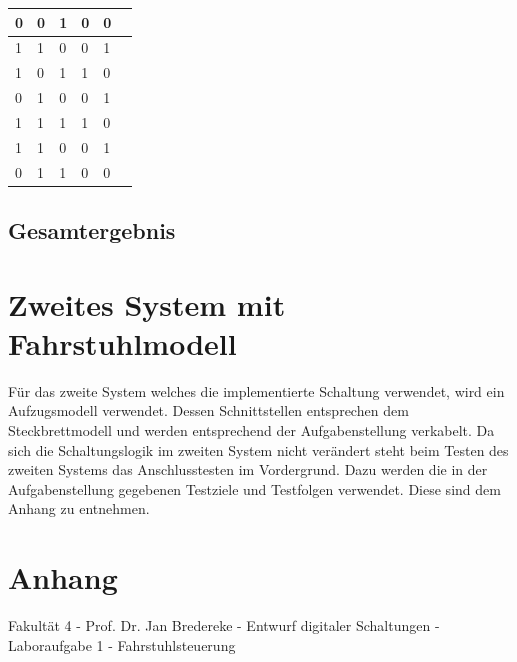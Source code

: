 \documentclass[a4paper,12pt,bibtotocnumbered]{scrartcl} %
\numberwithin{equation}{section} %
\begin{document}
\begin{table}[H]
\begin{tabular}{llllll}
		0          & 0          & \multicolumn{1}{l|}{1}      & 0             & 0 &               \\ \hline
		1          & 1          & \multicolumn{1}{l|}{0}      & 0             & 1 &               \\ \hline
		1          & 0          & \multicolumn{1}{l|}{1}      & 1             & 0 &               \\ \hline
		0          & 1          & \multicolumn{1}{l|}{0}      & 0             & 1 &               \\ \hline
		1          & 1          & \multicolumn{1}{l|}{1}      & 1             & 0 &               \\ \hline
		1          & 1          & \multicolumn{1}{l|}{0}      & 0             & 1 &               \\ \hline
		0          & 1          & \multicolumn{1}{l|}{1}      & 0             & 0 &               \\ \hline
	\end{tabular}
\end{table}

\newpage
\subsection{Gesamtergebnis}

\newpage

\section{Zweites System mit Fahrstuhlmodell}

Für das zweite System welches die implementierte Schaltung verwendet, wird ein Aufzugsmodell verwendet.
Dessen Schnittstellen entsprechen dem Steckbrettmodell und werden entsprechend der Aufgabenstellung verkabelt.
Da sich die Schaltungslogik im zweiten System nicht verändert steht beim Testen des zweiten Systems das Anschlusstesten im Vordergrund.
Dazu werden die in der Aufgabenstellung gegebenen Testziele und Testfolgen verwendet. Diese sind dem Anhang zu entnehmen.

\section{Anhang}

Fakultät 4 - Prof. Dr. Jan Bredereke - Entwurf digitaler Schaltungen - Laboraufgabe 1 - Fahrstuhlsteuerung


\end{document}
